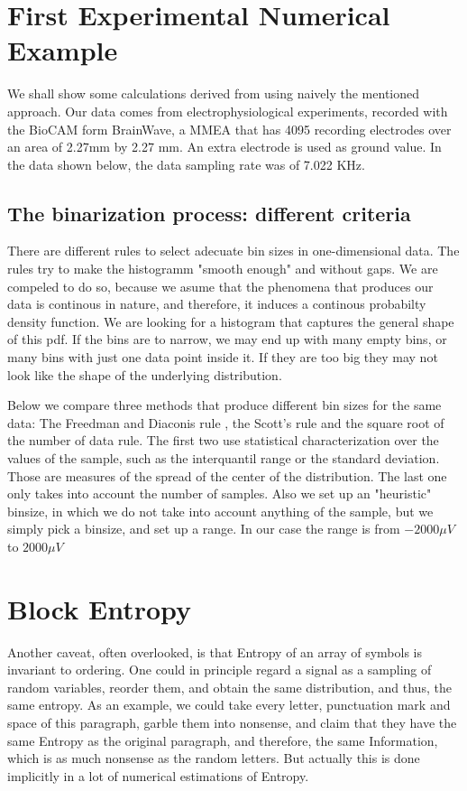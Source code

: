 \documentclass{article}
\begin{document}
\section{ First Experimental Numerical Example }

We shall show some calculations derived from using naively the mentioned approach. Our data comes from electrophysiological experiments, recorded with the BioCAM form BrainWave, a MMEA that has 4095 recording electrodes over an area of 2.27mm by 2.27 mm. An extra
electrode is used as ground value. In the data shown below, the data sampling rate was of 7.022 KHz.

\subsection{The binarization process: different criteria}

There are different rules to select adecuate bin sizes in one-dimensional data. The rules try to make the histogramm "smooth enough" and without gaps. We are compeled to do so, because we asume that the phenomena that produces our data is continous in nature, and therefore, it induces a continous probabilty density function. We are looking for a histogram that captures the general shape of this pdf. If the bins are to narrow, we may end up with many empty bins, or many bins with just one data point inside it. If they are too big they may not look like the shape of the underlying distribution.

Below we compare three  methods that produce different bin sizes for the same data: The Freedman and Diaconis rule \cite{FD1981}, the Scott's rule \cite{Scott1979} and the square root of the number of data rule. The first two use statistical characterization over the values of the sample, such as the interquantil range or the standard deviation. Those are measures of the spread of the center of the distribution. The last one only takes into account the number of samples. Also we set up an "heuristic" binsize, in which we do not take into account anything of the sample, but we simply pick a binsize, and set up a range. In our case the range is from $-2000 \mu V$ to $2000 \mu V$




\section{Block Entropy}

Another caveat, often overlooked, is that Entropy of an array of symbols is invariant to ordering. One could in principle regard a signal as a sampling of random variables, reorder them, and obtain the same distribution, and thus, the same entropy. As an example, we could take every letter, punctuation mark and space of this paragraph, garble them into nonsense, and claim that they have the same Entropy as the original paragraph, and therefore, the same Information, which is as much nonsense as the random letters. But actually this is done implicitly in a lot of numerical estimations of Entropy.



{}

\end{document}
